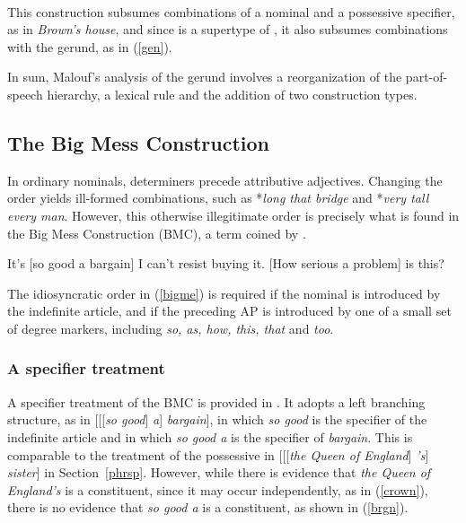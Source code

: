 \documentclass[output=paper,biblatex,babelshorthands,newtxmath,draftmode,colorlinks,citecolor=brown]{langscibook}
\begin{document}
\begin{exe} 
\ex\label{gencx} 
 ~ \impl ~ 
\end{exe}

\largerpage[1.5] 
\noindent
This construction subsumes combinations of a nominal and a 
possessive specifier, as in \emph{Brown's house}, and since 
 is a supertype of ,  
it also subsumes combinations with the gerund, as in (\ref{gen}). 

In sum, Malouf's analysis of the gerund involves a reorganization of the 
part-of-speech hierarchy, a lexical rule and the addition of two construction types.     



\subsection{The Big Mess Construction} 
\label{bime}  


In ordinary nominals, determiners precede attributive adjectives. Changing the order 
yields ill-formed combinations, such as *\emph{long that bridge} and *\emph{very tall every man}. 
However, this otherwise illegitimate order is precisely what is found in 
the Big Mess Construction (BMC), a term coined by \citet{Berman74}\addpages.  

\begin{exe}
\ex\label{bigme}
\begin{xlist}
\ex   It's [so good a bargain] I can't resist buying it.
\ex   {}[How serious a problem] is this?
\end{xlist}
\end{exe} 

\noindent
The idiosyncratic order in (\ref{bigme}) is required if the nominal is introduced 
by the indefinite article, and if the preceding AP is introduced by one of a small 
set of degree markers, including \emph{so, as, how, this, that} and \emph{too}. 


\subsubsection{A specifier treatment} 


A specifier treatment of the BMC is provided in \citet[201]{GS00}. It adopts  
a left branching structure, as in [[[\emph{so good}] \emph{a}] \emph{bargain}], 
in which \emph{so good} is the specifier of the indefinite article and in which 
\emph{so good a} is the specifier of \emph{bargain}. 
This is comparable to the treatment of the possessive in 
[[[\emph{the Queen of England}] \emph{'s}] \emph{sister}] in Section~\ref{phrsp}.  
However, while there is evidence that \emph{the Queen of England's} is a constituent,
since it may occur independently, as in (\ref{crown}), there is no evidence that 
\emph{so good a} is a constituent, as shown in (\ref{brgn}).
\end{document}
